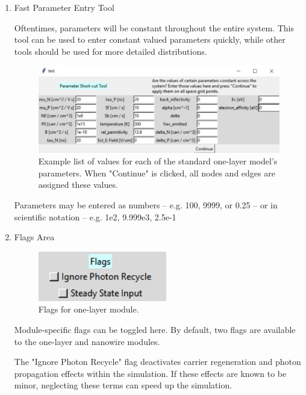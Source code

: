 \documentclass[11pt,letterpaper,titlepage]{article}
\begin{document}
\begin{enumerate}
				\item Fast Parameter Entry Tool
				
				\par Oftentimes, parameters will be constant throughout the entire system. This tool can be used to enter constant valued parameters quickly, while other tools should be used for more detailed distributions.
				
				\begin{figure}[H]
					\label{fig:fast_param_entry_tool}
					\centering
					\includegraphics[scale=0.7]{"fast_param_entry_tool"}
					\caption{Example list of values for each of the standard one-layer model's parameters. When "Continue" is clicked, all nodes and edges are assigned these values.}
				\end{figure}
			
				\par Parameters may be entered as numbers – e.g. 100, 9999, or 0.25 – or in scientific notation – e.g. 1e2, 9.999e3, 2.5e-1
				
				\item Flags Area
				
				\begin{figure}[H]
					\label{fig:flags}
					\centering
					\includegraphics[scale=1.5]{"flags"}
					\caption{Flags for one-layer module.}
				\end{figure}
				
				\par Module-specific flags can be toggled here. By default, two flags are available to the one-layer and nanowire modules.
				
				\par The "Ignore Photon Recycle" flag deactivates carrier regeneration and photon propagation effects within the simulation. If these effects are known to be minor, neglecting these terms can speed up the simulation.
				

\end{enumerate}
\end{document}
